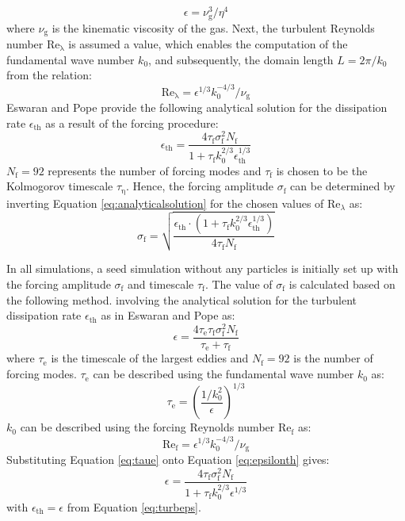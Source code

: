 \documentclass[times,twocolumn,final]{elsarticle}
\newcommand{\mrm}[1]{\mathrm{#1}}
\newcommand{\Rel}{\mathrm{Re}_\lambda}
\begin{document}
{\begin{equation}
    \epsilon = \nu_\mrm{g}^3/\eta^4 \label{eq:turbeps}
\end{equation}
where $\nu_\mrm{g}$ is the kinematic viscosity of the gas. Next, the turbulent Reynolds number $\mathrm{Re}_\mrm{\lambda}$ is assumed a value, which enables the computation of the fundamental wave number $k_0$, and subsequently, the domain length $L=2\pi/k_0$ from the relation:
\begin{equation}
    \mathrm{Re}_\mrm{\lambda} = \epsilon^{1/3}k_0^{-4/3}/\nu_\mrm{g} \label{eq:rel}
\end{equation}
Eswaran and Pope \cite{Eswaran1988} provide the following analytical solution for the dissipation rate $\epsilon_\mathrm{th}$ as a result of the forcing procedure:
\begin{equation}
    \epsilon_\mrm{th} = \frac{4\tau_\mrm{f}\sigma_\mrm{f}^2N_\mrm{f}}{1+\tau_\mrm{f}k_0^{2/3}\epsilon_\mrm{th}^{1/3}} \label{eq:analyticalsolution}
\end{equation}
 $N_\mrm{f}=92$ represents the number of forcing modes and $\tau_\mrm{f}$ is chosen to be the Kolmogorov timescale $\tau_\mrm{\eta}$. Hence, the forcing amplitude $\sigma_\mrm{f}$ can be determined by inverting Equation \ref{eq:analyticalsolution} for the chosen values of $\Rel$ as:
\begin{equation}
    \sigma_\mrm{f} = \sqrt{\frac{\epsilon_\mrm{th} \cdot \left( 1+\tau_\mrm{f}k_0^{2/3}\epsilon_\mrm{th}^{1/3}\right) }{4\tau_\mrm{f}N_\mrm{f}}}
\end{equation}

\iffalse In all simulations, a seed simulation without any particles is initially set up with the forcing amplitude $\sigma_\mrm{f}$ and timescale $\tau_\mrm{f}$. The value of $\sigma_\mrm{f}$ is calculated based on the following method. involving the analytical solution for the turbulent dissipation rate $\epsilon_\mrm{th}$ as in Eswaran and Pope \cite{Eswaran1988} as:
\begin{equation}
    \epsilon = \frac{4\tau_\mrm{e} \tau_\mrm{f}\sigma_\mrm{f}^2N_\mrm{f}}{\tau_\mrm{e} + \tau_\mrm{f}} \label{eq:epsilonth} 
\end{equation}
\noindent where $\tau_\mrm{e}$ is the timescale of the largest eddies and $N_\mrm{f}=92$ is the number of forcing modes. $\tau_\mrm{e}$ can be described using the fundamental wave number $k_0$ as:
\begin{equation}
    \tau_\mrm{e} = \left( \frac{1/k_0^2}{\epsilon}\right)^{1/3} \label{eq:taue}
\end{equation}
$k_0$ can be described using the forcing Reynolds number $\mathrm{Re}_\mrm{f}$ as:
\begin{equation}
    \mathrm{Re}_\mrm{f} = \epsilon^{1/3}k_0^{-4/3}/\nu_\mrm{g} \label{eq:rel}
\end{equation}
Substituting Equation \ref{eq:taue} onto Equation \ref{eq:epsilonth} gives:
\begin{equation}
    \epsilon = \frac{4\tau_\mrm{f}\sigma_\mrm{f}^2N_\mrm{f}}{1+\tau_\mrm{f}k_0^{2/3}\epsilon^{1/3}} \label{eq:analyticalsolution}
\end{equation}
\noindent with $\epsilon_\mrm{th}=\epsilon$ from Equation \ref{eq:turbeps}.

}
\end{document}
